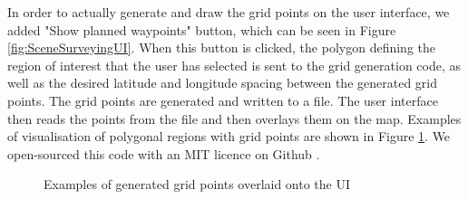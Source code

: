 In order to actually generate and draw the grid points on the user interface, we added "Show planned waypoints" button, which can be seen in Figure \ref{fig:SceneSurveyingUI}. When this button is clicked, the polygon defining the region of interest that the user has selected is sent to the grid generation code, as well as the desired latitude and longitude spacing between the generated grid points. The grid points are generated and written to a file. The user interface then reads the points from the file and then overlays them on the map. Examples of visualisation of polygonal regions with grid points are shown in Figure \ref{fig:GridPointsOnUI}. We open-sourced this code with an MIT licence on Github \cite{SceneSurveyingUI}.


\begin{figure}[h]
\centering
\hspace{0.2em}
\caption{Examples of generated grid points overlaid onto the UI}
\label{fig:GridPointsOnUI}
\end{figure}

















